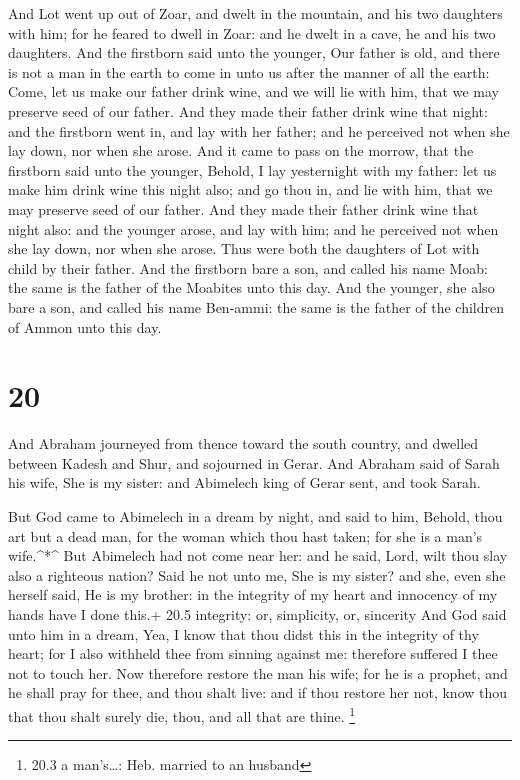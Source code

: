  And Lot went up out of Zoar, and dwelt in the mountain,
and his two daughters with him; for he feared to dwell in Zoar: and he
dwelt in a cave, he and his two daughters.  And the
firstborn said unto the younger, Our father is old, and there is not a
man in the earth to come in unto us after the manner of all the earth:
 Come, let us make our father drink wine, and we will lie
with him, that we may preserve seed of our father.  And
they made their father drink wine that night: and the firstborn went in,
and lay with her father; and he perceived not when she lay down, nor
when she arose.  And it came to pass on the morrow, that
the firstborn said unto the younger, Behold, I lay yesternight with my
father: let us make him drink wine this night also; and go thou in, and
lie with him, that we may preserve seed of our father.  And
they made their father drink wine that night also: and the younger
arose, and lay with him; and he perceived not when she lay down, nor
when she arose.  Thus were both the daughters of Lot with
child by their father.  And the firstborn bare a son, and
called his name Moab: the same is the father of the Moabites unto this
day.  And the younger, she also bare a son, and called his
name Ben-ammi: the same is the father of the children of Ammon unto this
day.

\hypertarget{section-19}{%
\section{20}\label{section-19}}

 And Abraham journeyed from thence toward the south country,
and dwelled between Kadesh and Shur, and sojourned in Gerar.
 And Abraham said of Sarah his wife, She is my sister: and
Abimelech king of Gerar sent, and took Sarah.

 But God came to Abimelech in a dream by night, and said to
him, Behold, thou art but a dead man, for the woman which thou hast
taken; for she is a man's wife.\^{}*\^{}  But Abimelech had
not come near her: and he said, Lord, wilt thou slay also a righteous
nation?  Said he not unto me, She is my sister? and she,
even she herself said, He is my brother: in the integrity of my heart
and innocency of my hands have I done this.+ 20.5 integrity: or,
simplicity, or, sincerity  And God said unto him in a dream,
Yea, I know that thou didst this in the integrity of thy heart; for I
also withheld thee from sinning against me: therefore suffered I thee
not to touch her.  Now therefore restore the man his wife;
for he is a prophet, and he shall pray for thee, and thou shalt live:
and if thou restore her not, know thou that thou shalt surely die, thou,
and all that are thine. \footnote{20.3 a man's\ldots: Heb. married to an
  husband}

